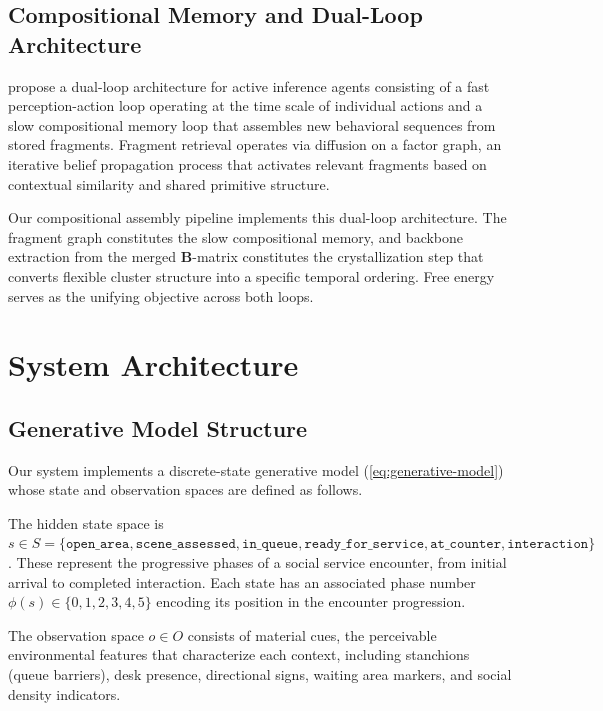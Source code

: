 \documentclass[11pt,a4paper]{article}
\newcommand{\B}{\mathbf{B}}
\begin{document}
\subsection{Compositional Memory and Dual-Loop Architecture}

\citet{nair2026thinking} propose a dual-loop architecture for active inference agents consisting of a fast perception-action loop operating at the time scale of individual actions and a slow compositional memory loop that assembles new behavioral sequences from stored fragments.  Fragment retrieval operates via diffusion on a factor graph, an iterative belief propagation process that activates relevant fragments based on contextual similarity and shared primitive structure.

Our compositional assembly pipeline implements this dual-loop architecture.  The fragment graph constitutes the slow compositional memory, and backbone extraction from the merged $\B$-matrix constitutes the crystallization step that converts flexible cluster structure into a specific temporal ordering.  Free energy serves as the unifying objective across both loops.


\section{System Architecture}
\label{sec:architecture}

\subsection{Generative Model Structure}

Our system implements a discrete-state generative model (\cref{eq:generative-model}) whose state and observation spaces are defined as follows.

The hidden state space is $s \in S = \{\texttt{open\_area}, \texttt{scene\_assessed}, \texttt{in\_queue}, \texttt{ready\_for\_service}, \texttt{at\_counter}, \texttt{interaction}\}$.  These represent the progressive phases of a social service encounter, from initial arrival to completed interaction.  Each state has an associated phase number $\phi(s) \in \{0, 1, 2, 3, 4, 5\}$ encoding its position in the encounter progression.

The observation space $o \in O$ consists of material cues, the perceivable environmental features that characterize each context, including stanchions (queue barriers), desk presence, directional signs, waiting area markers, and social density indicators.
\end{document}

